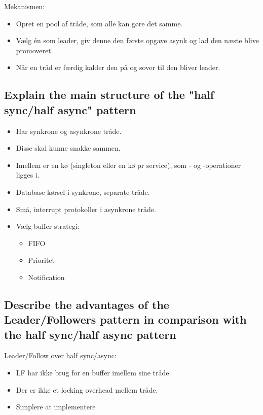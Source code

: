 \documentclass{article}
\begin{document}
Mekanismen:
\vspace{-10pt}
\begin{itemize}
	\item Opret en pool af tråde, som alle kan gøre det samme.
	\item Vælg én som leader, giv denne den første opgave asynk og lad den næste blive promoveret.
	\item Når en tråd er færdig kalder den  på  og sover til den bliver leader.
\end{itemize}


\subsection{Explain the main structure of the "half sync/half async" pattern}

\begin{itemize}
	\item Har synkrone og asynkrone tråde.
	\item Disse skal kunne snakke sammen.
	\item Imellem er en kø (singleton eller en kø pr service), som - og -operationer ligges i.
	\item Database kørsel i synkrone, separate tråde.
	\item Små, interrupt protokoller i asynkrone tråde.
	\item Vælg buffer strategi:
	\begin{itemize}
		\item FIFO
		\item Prioritet
		\item Notification 
	\end{itemize}
\end{itemize}


\subsection{Describe the advantages of the Leader/Followers pattern in comparison with the half sync/half async pattern}

Leader/Follow over half sync/async:
\vspace{-10pt}
\begin{itemize}
	\item LF har ikke brug for en buffer imellem sine tråde.
	\item Der er ikke et locking overhead mellem tråde.
	\item Simplere at implementere
\end{itemize}
\end{document}
